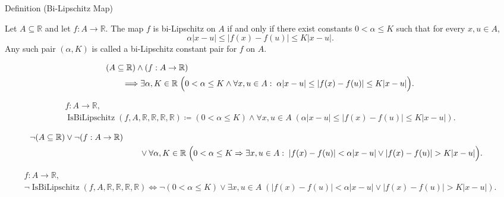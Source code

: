 
\begin{definitionbox}{Definition (Bi-Lipschitz Map)}
\begin{definition}
\label{def:bi-lipschitz}
Let $A\subseteq \mathbb{R}$ and let $f:A\to\mathbb{R}$. The map $f$ is bi-Lipschitz on $A$ if and only if there exist constants $0<\alpha\le K$ such that for every $x,u\in A$,
\[
\alpha|x-u|\le |f(x)-f(u)|\le K|x-u|.
\]
Any such pair $(\alpha,K)$ is called a bi-Lipschitz constant pair for $f$ on $A$.
\end{definition}
\end{definitionbox}

\begin{remark*}
\[
\begin{aligned}
&(A\subseteq\mathbb{R})\land(f:A\to\mathbb{R})\\
&\qquad\Longrightarrow
\exists \alpha,K\in\mathbb{R}\;\Bigl(0<\alpha\le K
\land \forall x,u\in A:\; \alpha|x-u|\le |f(x)-f(u)|\le K|x-u|\Bigr).
\end{aligned}
\]
\end{remark*}

\begin{remark*}
\[
\begin{aligned}
  f\colon A\to\mathbb{R},\\
\operatorname{IsBiLipschitz}(f,A,\mathbb{R},\mathbb{R},\mathbb{R},\mathbb{R}) \coloneqq \left(0<\alpha\le K\right) \land \forall x,u\in A\; \left(\alpha|x-u|\le |f(x)-f(u)|\le K|x-u|\right).
\end{aligned}
\]
\end{remark*}

\begin{remark*}
\[
\begin{aligned}
\neg(A\subseteq\mathbb{R})\lor\neg(f:A\to\mathbb{R})\\
&\qquad\lor
\forall \alpha,K\in\mathbb{R}\;\Bigl(0<\alpha\le K \Rightarrow
\exists x,u\in A:\; |f(x)-f(u)|<\alpha|x-u| \lor |f(x)-f(u)|>K|x-u|\Bigr).
\end{aligned}
\]
\end{remark*}

\begin{remark*}
\[
\begin{aligned}
  f\colon A\to\mathbb{R},\\
\neg\operatorname{IsBiLipschitz}(f,A,\mathbb{R},\mathbb{R},\mathbb{R},\mathbb{R}) \Longleftrightarrow \neg(0<\alpha\le K) \lor \exists x,u\in A\; \left(|f(x)-f(u)|<\alpha|x-u| \lor |f(x)-f(u)|>K|x-u|\right).
\end{aligned}
\]
\end{remark*}

